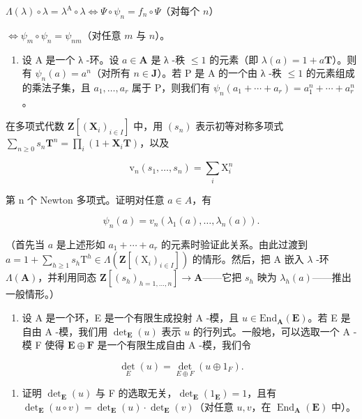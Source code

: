 \(\Lambda (\lambda)\circ \lambda = \lambda^{\mathrm{A}}\circ \lambda \Leftrightarrow \Psi \circ \psi_{n} = f_{n}\circ \Psi\)（对每个 \(n\)）

\(\Leftrightarrow \psi_{m} \circ \psi_{n} = \psi_{nm}\)（对任意 \(m\) 与 \(n\)）。

\begin{enumerate}
\def\labelenumi{\alph{enumi})}
\setcounter{enumi}{3}
\tightlist
\item
  设 A 是一个 λ -环。设 \(a \in \mathbf{A}\) 是 λ -秩 \(\leqslant 1\) 的元素（即 \(\lambda(a) = 1 + a\mathbf{T}\)）。则有 \(\psi_n(a) = a^n\)（对所有 \(n \in \mathbf{J}\)）。若 P 是 A 的一个由 λ -秩 \(\leqslant 1\) 的元素组成的乘法子集，且 \(a_1, \ldots, a_r\) 属于 P，则我们有 \(\psi_n(a_1 + \cdots + a_r) = a_1^n + \cdots + a_r^n\)。
\end{enumerate}

在多项式代数 \(\mathbf{Z}[(\mathbf{X}_{i})_{i\in I}]\) 中，用 \((s_{n})\) 表示初等对称多项式 \(\sum_{n\geq0}s_{n}\mathbf{T}^{n}=\prod_{i}(1+\mathbf{X}_{i}\mathbf{T})\)，以及

\[
\mathrm{v} _ {n} (s _ {1}, \dots , s _ {n}) = \sum_ {i} \mathrm{X} _ {i} ^ {n}
\]

第 n 个 Newton 多项式。证明对任意 \(a \in A\)，有

\[
\psi_ {n} (a) = v _ {n} \left(\lambda_ {1} (a), \dots , \lambda_ {n} (a)\right).
\]

（首先当 \(a\) 是上述形如 \(a_{1} + \cdots + a_{r}\) 的元素时验证此关系。由此过渡到 \(a = 1 + \sum_{h \geqslant 1} s_{h} \mathrm{T}^{h} \in \Lambda(\mathbf{Z}[(\mathrm{X}_{i})_{i \in I}])\) 的情形。然后，把 A 嵌入 \(\lambda\) -环 \(\Lambda(\mathbf{A})\)，并利用同态 \(\mathbf{Z}[(s_{h})_{h=1,\ldots,n}] \to \mathbf{A}\)——它把 \(s_{h}\) 映为 \(\lambda_{h}(a)\)——推出一般情形。）

\begin{enumerate}
\def\labelenumi{\arabic{enumi})}
\setcounter{enumi}{48}
\tightlist
\item
  设 A 是一个环，E 是一个有限生成投射 A -模，且 \(u \in \text{End}_{\mathbf{A}}(\mathbf{E})\)。若 E 是自由 A -模，我们用 \(\det_{\mathbf{E}}(u)\) 表示 \(u\) 的行列式。一般地，可以选取一个 A -模 F 使得 \(\mathbf{E} \oplus \mathbf{F}\) 是一个有限生成自由 A -模，我们令
\end{enumerate}

\[
\det _ {E} (u) = \det _ {E \oplus F} (u \oplus 1 _ {F}).
\]

\begin{enumerate}
\def\labelenumi{\alph{enumi})}
\tightlist
\item
  证明 \(\operatorname{det}_{\mathbf{E}}(u)\) 与 F 的选取无关，\(\operatorname{det}_{\mathbf{E}}(1_{\mathbf{E}}) = 1\)，且有 \(\operatorname{det}_{\mathbf{E}}(u \circ v) = \operatorname{det}_{\mathbf{E}}(u) \cdot \operatorname{det}_{\mathbf{E}}(v)\)（对任意 \(u, v\)，在 \(\operatorname{End}_{\mathbf{A}}(\mathbf{E})\) 中）。
\end{enumerate}
